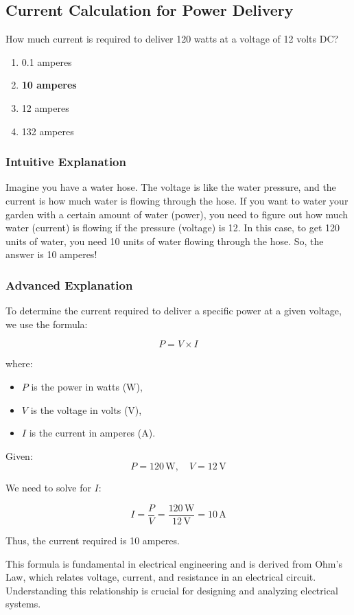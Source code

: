\subsection{Current Calculation for Power Delivery}
\label{T5C11}

\begin{tcolorbox}[colback=gray!10!white,colframe=black!75!black,title=T5C11]
How much current is required to deliver 120 watts at a voltage of 12 volts DC?
\begin{enumerate}[label=\Alph*)]
    \item 0.1 amperes
    \item \textbf{10 amperes}
    \item 12 amperes
    \item 132 amperes
\end{enumerate}
\end{tcolorbox}

\subsubsection{Intuitive Explanation}
Imagine you have a water hose. The voltage is like the water pressure, and the current is how much water is flowing through the hose. If you want to water your garden with a certain amount of water (power), you need to figure out how much water (current) is flowing if the pressure (voltage) is 12. In this case, to get 120 units of water, you need 10 units of water flowing through the hose. So, the answer is 10 amperes!

\subsubsection{Advanced Explanation}
To determine the current required to deliver a specific power at a given voltage, we use the formula:

\[
P = V \times I
\]

where:
\begin{itemize}
    \item \( P \) is the power in watts (W),
    \item \( V \) is the voltage in volts (V),
    \item \( I \) is the current in amperes (A).
\end{itemize}

Given:
\[
P = 120 \, \text{W}, \quad V = 12 \, \text{V}
\]

We need to solve for \( I \):

\[
I = \frac{P}{V} = \frac{120 \, \text{W}}{12 \, \text{V}} = 10 \, \text{A}
\]

Thus, the current required is 10 amperes.

This formula is fundamental in electrical engineering and is derived from Ohm's Law, which relates voltage, current, and resistance in an electrical circuit. Understanding this relationship is crucial for designing and analyzing electrical systems.

